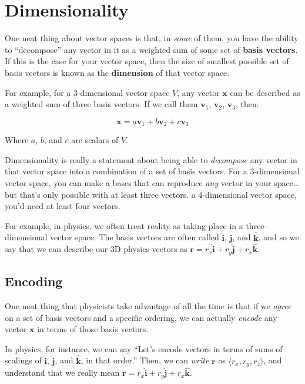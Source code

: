 \documentclass[]{article}
\begin{document}
\section{Dimensionality}\label{dimensionality}

One neat thing about vector spaces is that, in \emph{some} of them, you have the
ability to ``decompose'' any vector in it as a weighted sum of some set of
\textbf{basis vectors}. If this is the case for your vector space, then the size
of smallest possible set of basis vectors is known as the \textbf{dimension} of
that vector space.

For example, for a 3-dimensional vector space \(V\), any vector \(\mathbf{x}\)
can be described as a weighted sum of three basis vectors. If we call them
\(\mathbf{v}_1\), \(\mathbf{v}_2\), \(\mathbf{v}_3\), then:

\[
\mathbf{x} = a \mathbf{v}_1 + b \mathbf{v}_2 + c \mathbf{v}_3
\]

Where \(a\), \(b\), and \(c\) are scalars of \(V\).

Dimensionality is really a statement about being able to \emph{decompose} any
vector in that vector space into a combination of a set of basis vectors. For a
3-dimensional vector space, you can make a bases that can reproduce \emph{any}
vector in your space\ldots but that's only possible with at least three vectors.
a 4-dimensional vector space, you'd need at least four vectors.

For example, in physics, we often treat reality as taking place in a
three-dimensional vector space. The basis vectors are often called
\(\hat{\mathbf{i}}\), \(\hat{\mathbf{j}}\), and \(\hat{\mathbf{k}}\), and so we
say that we can describe our 3D physics vectors as \(\mathbf{r} = r_x
\hat{\mathbf{i}} + r_y \hat{\mathbf{j}} + r_x \hat{\mathbf{k}}\).

\subsection{Encoding}\label{encoding}

One neat thing that physicists take advantage of all the time is that if we
\emph{agree} on a set of basis vectors and a specific ordering, we can actually
\emph{encode} any vector \(\mathbf{x}\) in terms of those basis vectors.

In physics, for instance, we can say ``Let's encode vectors in terms of sums of
scalings of \(\hat{\mathbf{i}}\), \(\hat{\mathbf{j}}\), and
\(\hat{\mathbf{k}}\), in that order.'' Then, we can \emph{write} \(\mathbf{r}\)
as \(\langle r_x, r_y, r_z
\rangle\), and understand that we really mean
\(\mathbf{r} = r_x \hat{\mathbf{i}}
+ r_y \hat{\mathbf{j}} + r_x \hat{\mathbf{k}}\).
\end{document}
